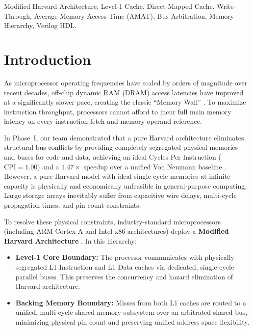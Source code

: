 \documentclass[conference]{IEEEtran}
\begin{document}
\begin{IEEEkeywords}
Modified Harvard Architecture, Level-1 Cache, Direct-Mapped Cache, Write-Through, Average Memory Access Time (AMAT), Bus Arbitration, Memory Hierarchy, Verilog HDL.
\end{IEEEkeywords}

\section{Introduction}
As microprocessor operating frequencies have scaled by orders of magnitude over recent decades, off-chip dynamic RAM (DRAM) access latencies have improved at a significantly slower pace, creating the classic ``Memory Wall'' \cite{wulf1995hitting}. To maximize instruction throughput, processors cannot afford to incur full main memory latency on every instruction fetch and memory operand reference.

In Phase~I, our team demonstrated that a pure Harvard architecture eliminates structural bus conflicts by providing completely segregated physical memories and buses for code and data, achieving an ideal Cycles Per Instruction ($\text{CPI} = 1.00$) and a $1.47\times$ speedup over a unified Von Neumann baseline \cite{hennessy2019computer}. However, a pure Harvard model with ideal single-cycle memories at infinite capacity is physically and economically unfeasible in general-purpose computing. Large storage arrays inevitably suffer from capacitive wire delays, multi-cycle propagation times, and pin-count constraints.

To resolve these physical constraints, industry-standard microprocessors (including ARM Cortex-A and Intel x86 architectures) deploy a \textbf{Modified Harvard Architecture} \cite{patterson2020computer, shen2013modern}. In this hierarchy:
\begin{itemize}
    \item \textbf{Level-1 Core Boundary:} The processor communicates with physically segregated L1 Instruction and L1 Data caches via dedicated, single-cycle parallel buses. This preserves the concurrency and hazard elimination of Harvard architecture.
    \item \textbf{Backing Memory Boundary:} Misses from both L1 caches are routed to a unified, multi-cycle shared memory subsystem over an arbitrated shared bus, minimizing physical pin count and preserving unified address space flexibility.
\end{itemize}
\end{document}
